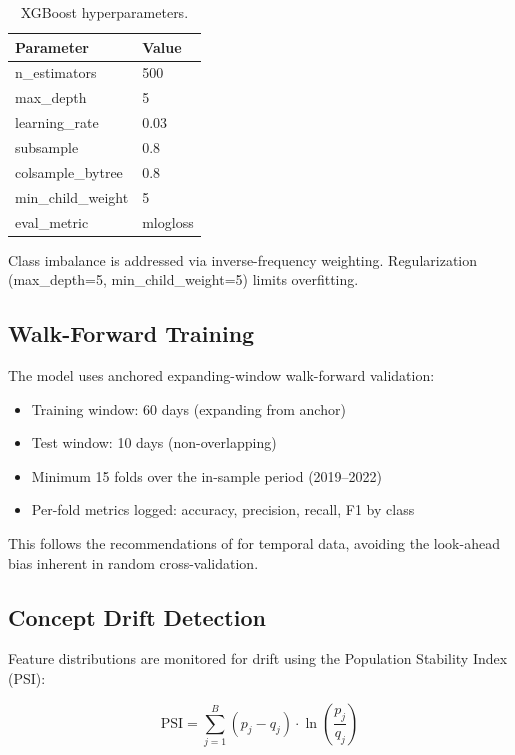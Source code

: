 \documentclass[12pt,a4paper]{article}
\begin{document}
\begin{table}[h!]
\centering
\caption{XGBoost hyperparameters.}
\begin{tabular}{@{}ll@{}}
\toprule
\textbf{Parameter} & \textbf{Value} \\
\midrule
n\_estimators & 500 \\
max\_depth & 5 \\
learning\_rate & 0.03 \\
subsample & 0.8 \\
colsample\_bytree & 0.8 \\
min\_child\_weight & 5 \\
eval\_metric & mlogloss \\
\bottomrule
\end{tabular}
\end{table}

Class imbalance is addressed via inverse-frequency weighting. Regularization (max\_depth=5, min\_child\_weight=5) limits overfitting.

\subsection{Walk-Forward Training}

The model uses anchored expanding-window walk-forward validation:

\begin{itemize}[leftmargin=*]
    \item Training window: 60 days (expanding from anchor)
    \item Test window: 10 days (non-overlapping)
    \item Minimum 15 folds over the in-sample period (2019--2022)
    \item Per-fold metrics logged: accuracy, precision, recall, F1 by class
\end{itemize}

This follows the recommendations of \citet{lopezdeprado2018advances} for temporal data, avoiding the look-ahead bias inherent in random cross-validation.

\subsection{Concept Drift Detection}

Feature distributions are monitored for drift using the Population Stability Index (PSI):

\begin{equation}
    \text{PSI} = \sum_{j=1}^{B} (p_j - q_j) \cdot \ln\!\left(\frac{p_j}{q_j}\right)
\end{equation}
\end{document}
